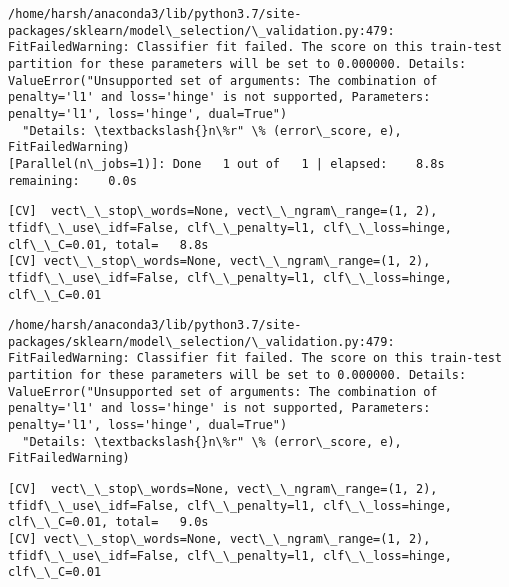 \documentclass[11pt]{article}
\begin{document}
    \begin{Verbatim}[commandchars=\\\{\}]
/home/harsh/anaconda3/lib/python3.7/site-packages/sklearn/model\_selection/\_validation.py:479: FitFailedWarning: Classifier fit failed. The score on this train-test partition for these parameters will be set to 0.000000. Details: 
ValueError("Unsupported set of arguments: The combination of penalty='l1' and loss='hinge' is not supported, Parameters: penalty='l1', loss='hinge', dual=True")
  "Details: \textbackslash{}n\%r" \% (error\_score, e), FitFailedWarning)
[Parallel(n\_jobs=1)]: Done   1 out of   1 | elapsed:    8.8s remaining:    0.0s

    \end{Verbatim}

    \begin{Verbatim}[commandchars=\\\{\}]
[CV]  vect\_\_stop\_words=None, vect\_\_ngram\_range=(1, 2), tfidf\_\_use\_idf=False, clf\_\_penalty=l1, clf\_\_loss=hinge, clf\_\_C=0.01, total=   8.8s
[CV] vect\_\_stop\_words=None, vect\_\_ngram\_range=(1, 2), tfidf\_\_use\_idf=False, clf\_\_penalty=l1, clf\_\_loss=hinge, clf\_\_C=0.01 

    \end{Verbatim}

    \begin{Verbatim}[commandchars=\\\{\}]
/home/harsh/anaconda3/lib/python3.7/site-packages/sklearn/model\_selection/\_validation.py:479: FitFailedWarning: Classifier fit failed. The score on this train-test partition for these parameters will be set to 0.000000. Details: 
ValueError("Unsupported set of arguments: The combination of penalty='l1' and loss='hinge' is not supported, Parameters: penalty='l1', loss='hinge', dual=True")
  "Details: \textbackslash{}n\%r" \% (error\_score, e), FitFailedWarning)

    \end{Verbatim}

    \begin{Verbatim}[commandchars=\\\{\}]
[CV]  vect\_\_stop\_words=None, vect\_\_ngram\_range=(1, 2), tfidf\_\_use\_idf=False, clf\_\_penalty=l1, clf\_\_loss=hinge, clf\_\_C=0.01, total=   9.0s
[CV] vect\_\_stop\_words=None, vect\_\_ngram\_range=(1, 2), tfidf\_\_use\_idf=False, clf\_\_penalty=l1, clf\_\_loss=hinge, clf\_\_C=0.01 

    \end{Verbatim}
\end{document}
